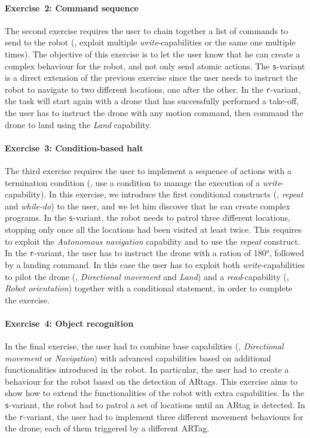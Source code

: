 \paragraph{Exercise~2: Command sequence} The second exercise requires the user to chain together a list of commands to send to the robot (\ie, exploit multiple \textit{write}-capabilities or the same one multiple times). The objective of this exercise is to let the user know that he can create a complex behaviour for the robot, and not only send atomic actions. The \texttt{s}-variant is a direct extension of the previous exercise since the user needs to instruct the robot to navigate to two different locations, one after the other. In the \texttt{r}-variant, the task will start again with a drone that has successfully performed a take-off, the user has to instruct the drone with any motion command, then command the drone to land using the \textit{Land} capability. 

\paragraph{Exercise~3: Condition-based halt} The third exercise requires the user to implement a sequence of actions with a termination condition (\ie, use a condition to manage the execution of a \textit{write}-capability). In this exercise, we introduce the first conditional constructs (\eg, \textit{repeat} and \textit{while-do}) to the user, and we let him discover that he can create complex programs. In the \texttt{s}-variant, the robot needs to patrol three different locations, stopping only once all the locations had been visited at least twice. This requires to exploit the \textit{Autonomous navigation} capability and to use the \textit{repeat} construct. In the \texttt{r}-variant, the user has to instruct the drone with a ration of \ang{180}, followed by a landing command. In this case the user has to exploit both \textit{write}-capabilities to pilot the drone (\ie, \textit{Directional movement} and \textit{Land}) and a \textit{read}-capability (\ie, \textit{Robot orientation}) together with a conditional statement, in order to complete the exercise.

\paragraph{Exercise~4: Object recognition} In the final exercise, the user had to combine base capabilities (\eg, \textit{Directional movement} or \textit{Navigation}) with advanced capabilities based on additional functionalities introduced in the robot. In particular, the user had to create a behaviour for the robot based on the detection of ARtags. This exercise aims to show how to extend the functionalities of the robot with extra capabilities.  In the \texttt{s}-variant, the robot had to patrol a set of locations until an ARtag is detected. In the \texttt{r}-variant, the user had to implement three different movement behaviours for the drone; each of them triggered by a different ARTag.

